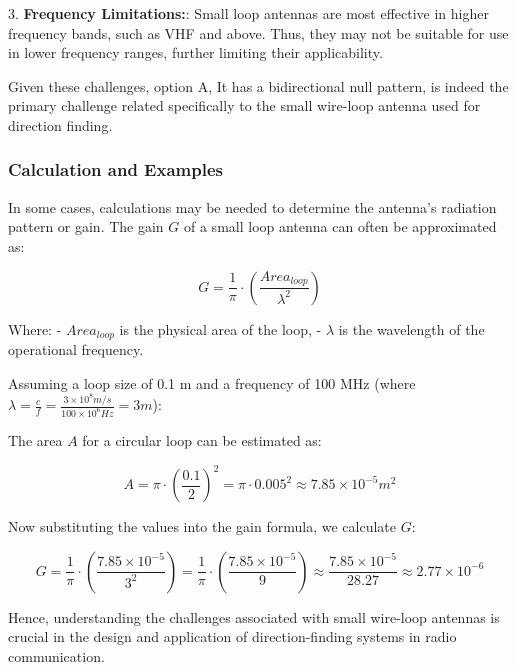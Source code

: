 3. \textbf{Frequency Limitations:}: Small loop antennas are most effective in higher frequency bands, such as VHF and above. Thus, they may not be suitable for use in lower frequency ranges, further limiting their applicability.

Given these challenges, option A, It has a bidirectional null pattern, is indeed the primary challenge related specifically to the small wire-loop antenna used for direction finding.

\subsubsection{Calculation and Examples}

In some cases, calculations may be needed to determine the antenna's radiation pattern or gain. The gain \( G \) of a small loop antenna can often be approximated as:

\[
G = \frac{1}{\pi}\cdot \left( \frac{Area_{loop}}{\lambda^2} \right)
\]

Where:
- \( Area_{loop} \) is the physical area of the loop,
- \( \lambda \) is the wavelength of the operational frequency.

Assuming a loop size of 0.1 m and a frequency of 100 MHz (where \( \lambda = \frac{c}{f} = \frac{3 \times 10^8 m/s}{100 \times 10^6 Hz} = 3 m \)):

The area \( A \) for a circular loop can be estimated as:

\[
A = \pi \cdot \left(\frac{0.1}{2}\right)^2 = \pi \cdot 0.005^2 \approx 7.85 \times 10^{-5} m^2
\]

Now substituting the values into the gain formula, we calculate \( G \):

\[
G = \frac{1}{\pi} \cdot \left(\frac{7.85 \times 10^{-5}}{3^2}\right) = \frac{1}{\pi} \cdot \left(\frac{7.85 \times 10^{-5}}{9}\right) \approx \frac{7.85 \times 10^{-5}}{28.27} \approx 2.77 \times 10^{-6}
\]

Hence, understanding the challenges associated with small wire-loop antennas is crucial in the design and application of direction-finding systems in radio communication.

\begin{center}
\end{center}

